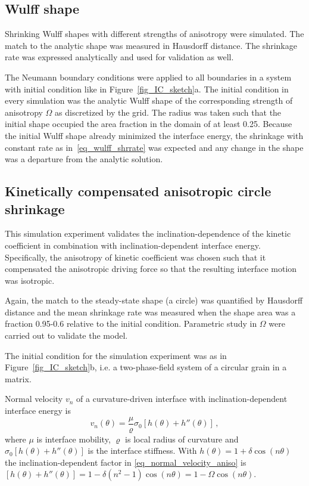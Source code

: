 \subsection{Wulff shape}

Shrinking Wulff shapes with different strengths of anisotropy were simulated. The match to the analytic shape was measured in Hausdorff distance. The shrinkage rate was expressed analytically and used for validation as well.

The Neumann boundary conditions were applied to all boundaries in a system with initial condition like in Figure~\ref{fig_IC_sketch}a. The initial condition in every simulation was the analytic Wulff shape of the corresponding strength of anisotropy $\Omega$ as discretized by the grid. The radius was taken such that the initial shape occupied the area fraction in the domain of at least 0.25. Because the initial Wulff shape already minimized the interface energy, the shrinkage with constant rate as in~\eqref{eq_wulff_shrrate} was expected and any change in the shape was a departure from the analytic solution. 

\subsection{Kinetically compensated anisotropic circle shrinkage}
This simulation experiment validates the inclination-dependence of the kinetic coefficient in combination with inclination-dependent interface energy. 
Specifically, the anisotropy of kinetic coefficient was chosen such that it compensated the anisotropic driving force so that the resulting interface motion was isotropic. 

Again, the match to the steady-state shape (a circle) was quantified by Hausdorff distance and the mean shrinkage rate was measured when the shape area was a fraction 0.95-0.6 relative to the initial condition. Parametric study in $\Omega$ were carried out to validate the model.

The initial condition for the simulation experiment was as in Figure~\ref{fig_IC_sketch}b, i.e. a two-phase-field system of a circular grain in a matrix.  

Normal velocity $v_n$ of a curvature-driven interface with inclination-dependent interface energy is~\cite{Abdeljawad2018}
\begin{equation}\label{eq_normal_velocity_aniso}
	v_n(\theta) = \frac{\mu}{\varrho}  \sigma_0[h(\theta)+h''(\theta)]\,,
\end{equation}
where $\mu$ is interface mobility, $\varrho$ is local radius of curvature and $\sigma_0[h(\theta)+h''(\theta)]$ is the interface stiffness. With $h(\theta)=1+\delta\cos(n\theta)$ the inclination-dependent factor in \eqref{eq_normal_velocity_aniso} is $[h(\theta)+h''(\theta)] = 1 - \delta(n^2-1)\cos(n\theta) = 1-\Omega\cos(n\theta)$.

